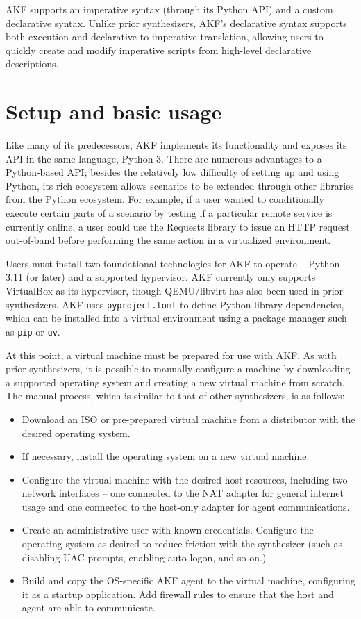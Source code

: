 \documentclass[letterpaper,12pt]{report}
\def\tightlist{}
\newcommand{\passthrough}[1]{#1}
\begin{document}
AKF supports an imperative syntax (through its Python API) and a custom
declarative syntax. Unlike prior synthesizers, AKF's declarative syntax
supports both execution and declarative-to-imperative translation,
allowing users to quickly create and modify imperative scripts from
high-level declarative descriptions.

\section{Setup and basic usage}\label{setup-and-basic-usage}

Like many of its predecessors, AKF implements its functionality and
exposes its API in the same language, Python 3. There are numerous
advantages to a Python-based API; besides the relatively low difficulty
of setting up and using Python, its rich ecosystem allows scenarios to
be extended through other libraries from the Python ecosystem. For
example, if a user wanted to conditionally execute certain parts of a
scenario by testing if a particular remote service is currently online,
a user could use the Requests library \cite{Requests31Documentation}
to issue an HTTP request out-of-band before performing the same action
in a virtualized environment.

Users must install two foundational technologies for AKF to operate --
Python 3.11 (or later) and a supported hypervisor. AKF currently only
supports VirtualBox as its hypervisor, though QEMU/libvirt has also been
used in prior synthesizers. AKF uses
\passthrough{\lstinline!pyproject.toml!} to define Python library
dependencies, which can be installed into a virtual environment using a
package manager such as \passthrough{\lstinline!pip!} or
\passthrough{\lstinline!uv!}.

At this point, a virtual machine must be prepared for use with AKF. As
with prior synthesizers, it is possible to manually configure a machine
by downloading a supported operating system and creating a new virtual
machine from scratch. The manual process, which is similar to that of
other synthesizers, is as follows:

\begin{itemize}
\tightlist
\item
  Download an ISO or pre-prepared virtual machine from a distributor
  with the desired operating system.
\item
  If necessary, install the operating system on a new virtual machine.
\item
  Configure the virtual machine with the desired host resources,
  including two network interfaces -- one connected to the NAT adapter
  for general internet usage and one connected to the host-only adapter
  for agent communications.
\item
  Create an administrative user with known credentials. Configure the
  operating system as desired to reduce friction with the synthesizer
  (such as disabling UAC prompts, enabling auto-logon, and so on.)
\item
  Build and copy the OS-specific AKF agent to the virtual machine,
  configuring it as a startup application. Add firewall rules to ensure
  that the host and agent are able to communicate.
\end{itemize}
\end{document}
